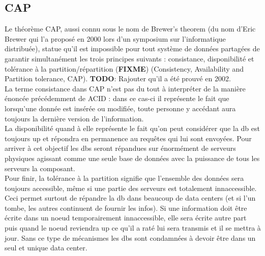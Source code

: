 \documentclass[11pt]{article}
\begin{document}
\subsection{CAP}
Le théorème CAP, aussi connu sous le nom de Brewer's theorem (du nom d'Eric Brewer qui l'a proposé en 2000 lors d'un symposium sur l'informatique distribuée), statue qu'il est impossible pour tout système de données partagées de garantir simultanément les trois principes suivants : consistance, disponibilité et tolérance à la partition/répartition (\textbf{FIXME}) (Consistency, Availability and Partition tolerance, CAP). \textbf{TODO}: Rajouter qu'il a été prouvé en 2002. \\
La terme consistance dans CAP n'est pas du tout à interpréter de la manière énoncée précédemment de ACID : dans ce cas-ci il représente le fait que lorsqu'une donnée est insérée ou modifiée, toute personne y accédant aura toujours la dernière version de l'information. \\
La disponibilité quand à elle représente le fait qu'on peut considérer que la db est toujours up et répondra en permanence au requêtes qui lui sont envoyées. Pour arriver à cet objectif les dbs seront répandues sur énormément de serveurs physiques agissant comme une seule base de données avec la puissance de tous les serveurs la composant. \\
Pour finir, la tolérance à la partition signifie que l'ensemble des données sera toujours accessible, même si une partie des serveurs est totalement innaccessible. Ceci permet surtout de répandre la db dans beaucoup de data centers (et si l'un tombe, les autres continuent de fournir les infos). Si une information doit être écrite dans un noeud temporairement innaccessible, elle sera écrite autre part puis quand le noeud reviendra up ce qu'il a raté lui sera transmis et il se mettra à jour. Sans ce type de mécanismes les dbs sont condamnées à devoir être dans un seul et unique data center. 
\end{document}
